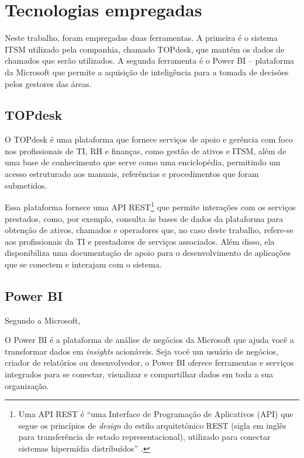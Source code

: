 \section{Tecnologias empregadas}


Neste trabalho, foram empregadas duas ferramentas. A primeira é o sistema ITSM utilizado pela companhia, chamado TOPdesk, que mantém os dados de chamados que serão utilizados. A segunda ferramenta é o Power BI -- plataforma da Microsoft que permite a aquisição de inteligência para a tomada de decisões pelos gestores das áreas. 


\subsection{TOPdesk}


O TOPdesk é uma plataforma que fornece serviços de apoio e gerência com foco nos profissionais de TI, RH e finanças, como gestão de ativos e ITSM, além de uma base de conhecimento que serve como uma enciclopédia, permitindo um acesso estruturado aos manuais, referências e procedimentos que foram submetidos. 


Essa plataforma fornece uma API REST\footnote{Uma API REST é ``uma Interface de Programação de Aplicativos (API) que segue os princípios de \textit{design} do estilo arquitetônico REST (sigla em inglês para transferência de estado representacional), utilizado para conectar sistemas hipermídia distribuídos'' \cite{REST_API_Definition}.} que permite interações com os serviços prestados, como, por exemplo, consulta às bases de dados da plataforma para obtenção de ativos, chamados e operadores que, no caso deste trabalho, refere-se aos profissionais da TI e prestadores de serviços associados. Além disso, ela disponibiliza uma  documentação de apoio para o desenvolvimento de aplicações que se conectem e interajam com o sistema. \cite{TOPdesk_API} 



\subsection{Power BI}


Segundo a Microsoft, 
\begin{quoting}[rightmargin=0cm,leftmargin=4cm]  \small
	O Power BI é a plataforma de análise de negócios da Microsoft que ajuda você a transformar dados em \textit{insights} acionáveis. Seja você um usuário de negócios, criador de relatórios ou desenvolvedor, o Power BI oferece ferramentas e serviços integrados para se conectar, visualizar e compartilhar dados em toda a sua organização. \cite{PBI_Sobre}
\end{quoting}


